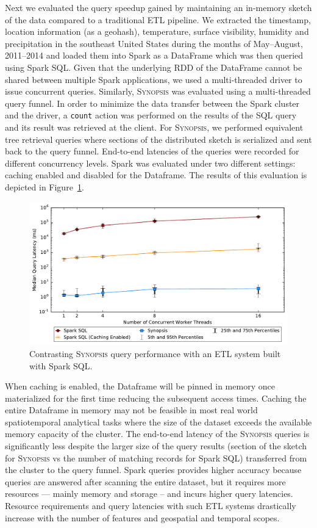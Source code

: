 \documentclass[9pt,journal,compsoc]{IEEEtran}
\begin{document}
Next we evaluated the query speedup gained by maintaining an in-memory sketch of the data compared to a traditional ETL pipeline.
We extracted the timestamp, location information (as a geohash), temperature, surface visibility, humidity and precipitation in the southeast United States during the months of May--August, 2011--2014 and loaded them into Spark as a DataFrame which was then queried using Spark SQL.
Given that the underlying RDD of the DataFrame cannot be shared between multiple Spark applications, we used a multi-threaded driver to issue concurrent queries.
Similarly, \textsc{Synopsis} was evaluated using a multi-threaded query funnel.
In order to minimize the data transfer between the Spark cluster and the driver, a \texttt{count} action was performed on the results of the SQL query and its result was retrieved at the client.
For \textsc{Synopsis}, we performed equivalent tree retrieval queries where sections of the distributed sketch is serialized and sent back to the query funnel.
End-to-end latencies of the queries were recorded for different concurrency levels.
Spark was evaluated under two different settings: caching enabled and disabled for the Dataframe.
The results of this evaluation is depicted in Figure~\ref{fig:spark-sql-query}.
%
\begin{figure}[b!]
    \centerline{\includegraphics[width=\linewidth]{figures/spark-sql-query-complete.pdf}}
    \caption{Contrasting \textsc{Synopsis} query performance with an ETL system built with Spark SQL.}
    \label{fig:spark-sql-query}
\end{figure}
%
When caching is enabled, the Dataframe will be pinned in memory once materialized for the first time reducing the subsequent access times. Caching the entire Dataframe in memory may not be feasible in most real world spatiotemporal analytical tasks where the size of the dataset exceeds the available memory capacity of the cluster.
The end-to-end latency of the \textsc{Synopsis} queries is significantly less despite the larger size of the query results (section of the sketch for \textsc{Synopsis} vs the number of matching records for Spark SQL) transferred from the cluster to the query funnel.
Spark queries provides higher accuracy because queries are answered after scanning the entire dataset, but it requires more resources --- mainly memory and storage -- and incurs higher query latencies.
Resource requirements and query latencies with such ETL systems drastically increase with the number of features and geospatial and temporal scopes.
%
%
\end{document}

